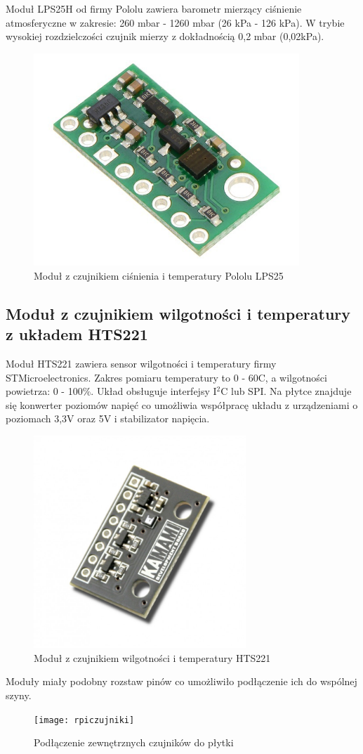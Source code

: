 Moduł LPS25H od firmy Pololu zawiera barometr mierzący ciśnienie atmosferyczne w zakresie: 260 mbar - 1260 mbar (26 kPa - 126 kPa). W trybie wysokiej rozdzielczości czujnik mierzy z dokładnością 0,2 mbar (0,02kPa).

\begin{figure}[h]
	\centering
		\includegraphics[width=10cm]{pololu}
	\caption{Moduł z czujnikiem ciśnienia i temperatury Pololu LPS25} 
	\label{pic:pololu}
\end{figure}

\subsection{Moduł z czujnikiem wilgotności i temperatury z układem HTS221}

Moduł HTS221 zawiera sensor wilgotności i temperatury firmy STMicroelectronics. Zakres pomiaru temperatury to 0 - 60\degree C, a wilgotności powietrza: 0 - 100\%. Układ obsługuje interfejsy I$^2$C lub SPI. Na płytce znajduje się konwerter poziomów napięć co umożliwia współpracę układu z urządzeniami o poziomach 3,3V oraz 5V i stabilizator napięcia.

\begin{figure}[t!]
	\centering
		\includegraphics[width=8cm]{hts221}
	\caption{Moduł z czujnikiem wilgotności i temperatury HTS221} 
	\label{pic:hts221}
\end{figure}

Moduły miały podobny rozstaw pinów co umożliwiło podłączenie ich do wspólnej szyny.

\begin{figure}[b!]
	\centering
		\texttt{[image: rpiczujniki]}
	\caption{Podłączenie zewnętrznych czujników do płytki} 
	\label{pic:rpiczujniki}
\end{figure}
